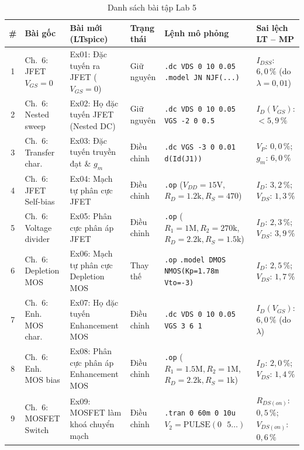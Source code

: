 \documentclass[12pt,a4paper]{article}
\newcommand{\hc}[1]{\cellcolor{navy}\color{white}\sffamily\bfseries\small #1}
\begin{document}
\begin{table}[H]\centering\small
\caption{Danh sách bài tập Lab 5}\label{tab:lab5}
\setlength{\tabcolsep}{3.5pt}
\renewcommand{\arraystretch}{1.2}
\begin{tabular}{|c|p{2.6cm}|p{3.2cm}|p{1.9cm}|p{3.2cm}|p{2.2cm}|}
\hline
\hc{\#} & \hc{Bài gốc} & \hc{Bài mới (LTspice)} & \hc{Trạng thái} & \hc{Lệnh mô phỏng} & \hc{Sai lệch LT -- MP}\\ \hline
1 & Ch.~6: JFET $V_{GS}=0$ & Ex01: Đặc tuyến ra JFET ($V_{GS}=0$) & Giữ nguyên & \texttt{.dc VDS 0 10 0.05} \newline \texttt{.model JN NJF(...)} & $I_{DSS}$: $6{,}0\,\%$ (do $\lambda=0{,}01$) \\ \hline
2 & Ch.~6: Nested sweep & Ex02: Họ đặc tuyến JFET (Nested DC) & Giữ nguyên & \texttt{.dc VDS 0 10 0.05 VGS -2 0 0.5} & $I_D(V_{GS})$: $< 5{,}9\,\%$ \\ \hline
3 & Ch.~6: Transfer char. & Ex03: Đặc tuyến truyền đạt \& $g_m$ & Điều chỉnh & \texttt{.dc VGS -3 0 0.01} \newline \texttt{d(Id(J1))} & $V_P$: $0{,}0\,\%$; $g_m$: $6{,}0\,\%$ \\ \hline
4 & Ch.~6: JFET Self-bias & Ex04: Mạch tự phân cực JFET & Điều chỉnh & \texttt{.op} ($V_{DD}=15\text{V}$, $R_D=1.2\text{k}, R_S=470$) & $I_D$: $3{,}2\,\%$; $V_{DS}$: $1{,}3\,\%$ \\ \hline
5 & Ch.~6: Voltage divider & Ex05: Phân cực phân áp JFET & Điều chỉnh & \texttt{.op} ($R_1=1\text{M}, R_2=270\text{k}$, $R_D=2.2\text{k}, R_S=1.5\text{k}$) & $I_D$: $2{,}3\,\%$; $V_{DS}$: $3{,}9\,\%$ \\ \hline
6 & Ch.~6: Depletion MOS & Ex06: Mạch tự phân cực Depletion MOS & Thay thế & \texttt{.op} \newline \texttt{.model DMOS NMOS(Kp=1.78m Vto=-3)} & $I_D$: $2{,}5\,\%$; $V_{DS}$: $1{,}7\,\%$ \\ \hline
7 & Ch.~6: Enh. MOS char. & Ex07: Họ đặc tuyến Enhancement MOS & Điều chỉnh & \texttt{.dc VDS 0 10 0.05 VGS 3 6 1} & $I_D(V_{GS})$: $6{,}0\,\%$ (do $\lambda$) \\ \hline
8 & Ch.~6: Enh. MOS bias & Ex08: Phân cực phân áp Enhancement MOS & Điều chỉnh & \texttt{.op} ($R_1=1.5\text{M}, R_2=1\text{M}$, $R_D=2.2\text{k}, R_S=1\text{k}$) & $I_D$: $2{,}0\,\%$; $V_{DS}$: $1{,}4\,\%$ \\ \hline
9 & Ch.~6: MOSFET Switch & Ex09: MOSFET làm khoá chuyển mạch & Điều chỉnh & \texttt{.tran 0 60m 0 10u} \newline $V_2=\text{PULSE}(0\text{ }5\dots)$ & $R_{DS(on)}$: $0{,}5\,\%$; $V_{DS(on)}$: $0{,}6\,\%$ \\ \hline

\end{tabular}
\end{table}
\end{document}
